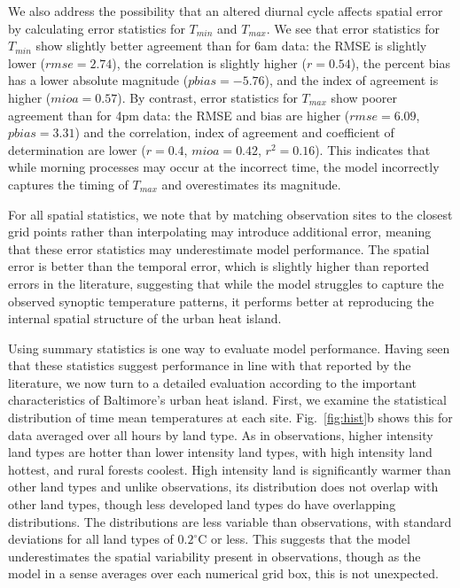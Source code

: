 \documentclass[draft,linenumbers]{agujournal}
\begin{document}
We also address the possibility that an altered diurnal cycle affects spatial error by calculating error statistics for $T_{min}$ and $T_{max}$. We see that error statistics for $T_{min}$ show slightly better agreement than for 6am data: the RMSE is slightly lower ($rmse = 2.74$), the correlation is slightly higher ($r=0.54$), the percent bias has a lower absolute magnitude ($pbias=-5.76$), and the index of agreement is higher ($mioa=0.57$). By contrast, error statistics for $T_{max}$ show poorer agreement than for 4pm data: 
the RMSE and bias are higher ($rmse=6.09$, $pbias=3.31$) and the correlation, index of agreement and coefficient of determination are lower ($r=0.4$, $mioa=0.42$, $r^2=0.16$). 
This indicates that while morning processes may occur at the incorrect time, the model incorrectly captures the timing of $T_{max}$ and overestimates its magnitude. 

For all spatial statistics, we note that by matching observation sites to the closest grid points rather than interpolating may introduce additional error, meaning that these error statistics may underestimate model performance. %
The spatial error is better than the temporal error, which is slightly higher than reported errors in the literature, 
suggesting that while the model struggles to capture the observed synoptic temperature patterns, it performs better at reproducing the internal spatial structure of the urban heat island.

Using summary statistics is one way to evaluate model performance. Having seen that these statistics suggest performance in line with that reported by the literature, we now turn to a detailed evaluation according to the important characteristics of Baltimore's urban heat island. 
First, we examine the statistical distribution of time mean temperatures at each site. Fig.~\ref{fig:hist}b shows this for data averaged over all hours by land type. As in observations, higher intensity land types are hotter than lower intensity land types, with high intensity land hottest, and rural forests coolest. High intensity land is significantly warmer than other land types and unlike observations, its distribution does not overlap with other land types, though less developed land types do have overlapping distributions. 
The distributions are less variable than observations, with standard deviations for all land types of $0.2^\circ$C or less. This suggests that the model underestimates the spatial variability present in observations, though as the model in a sense averages over each numerical grid box, this is not unexpected. 
\end{document}
